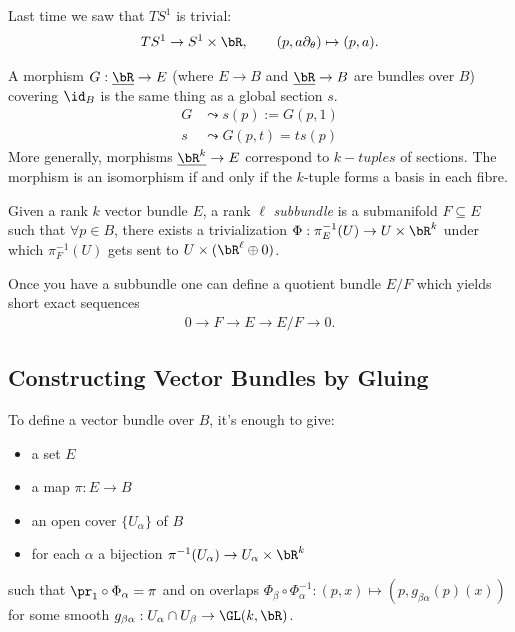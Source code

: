 \begin{example}\label{example:lec2.14}
	Last time we saw that $TS^1$ is trivial:
	\begin{align*}
		TS^1 \to S^1\times \bR, \hspace{2em} (p,a\partial_\theta) \mapsto (p,a).
	\end{align*}
\end{example}
\begin{example}\label{example:lec2.15}
	A morphism $G:\underline{\bR}\to E$ (where $E\to B$ and $\underline{\bR}\to B$ are bundles over $B$) covering $\id_B$ is the same thing as a global section $s$.
    \begin{align*}
		G &\leadsto s(p) := G(p,1) \\
		s &\leadsto G(p,t) = ts(p)
    \end{align*}
	More generally, morphisms $\underline{\bR^k}\to E$ correspond to $k-tuples$ of sections. The morphism is an isomorphism if and only if the $k$-tuple forms a basis in each fibre.
\end{example}
\begin{defn}\label{defn:subbundle}
	Given a rank $k$ vector bundle $E$, a rank $\ell$ \emph{subbundle} is a submanifold $F \subseteq E$ such that $\forall p \in B$, there exists a trivialization $\Phi:\pi^{-1}_E(U) \to U\times \bR^k$ under which $\pi^{-1}_F(U)$ gets sent to $U\times (\bR^\ell \oplus 0)$.
\end{defn}
Once you have a subbundle one can define a quotient bundle $E/F$ which yields short exact sequences
\begin{align*}
	0 \to F\to E\to E/F \to 0.
\end{align*}

\subsection{Constructing Vector Bundles by Gluing}
To define a vector bundle over $B$, it's enough to give:
\begin{itemize}
	\item a set $E$
	\item a map $\pi :E\to B$
	\item an open cover $\{U_\alpha\}$ of $B$
	\item for each $\alpha$ a bijection $\pi^{-1}(U_\alpha) \to U_\alpha \times \bR^k$
\end{itemize}
such that $\pr_1\circ \Phi_\alpha = \pi$ and on overlaps $\Phi_\beta\circ \Phi_\alpha^{-1}:(p,x) \mapsto (p,g_{\beta\alpha}(p)(x))$ for some smooth $g_{\beta\alpha}:U_\alpha\cap U_\beta \to \GL(k,\bR)$.

